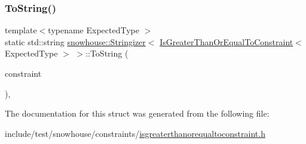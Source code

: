 \subsubsection{\texorpdfstring{ToString()}{ToString()}}
{\footnotesize\ttfamily template$<$typename Expected\+Type $>$ \\
static std\+::string \mbox{\hyperlink{structsnowhouse_1_1Stringizer}{snowhouse\+::\+Stringizer}}$<$ \mbox{\hyperlink{structsnowhouse_1_1IsGreaterThanOrEqualToConstraint}{Is\+Greater\+Than\+Or\+Equal\+To\+Constraint}}$<$ Expected\+Type $>$ $>$\+::To\+String (\begin{DoxyParamCaption}\item[{const \mbox{\hyperlink{structsnowhouse_1_1IsGreaterThanOrEqualToConstraint}{Is\+Greater\+Than\+Or\+Equal\+To\+Constraint}}$<$ Expected\+Type $>$ \&}]{constraint }\end{DoxyParamCaption})\hspace{0.3cm}{\ttfamily [inline]}, {\ttfamily [static]}}



The documentation for this struct was generated from the following file\+:\begin{DoxyCompactItemize}
\item 
include/test/snowhouse/constraints/\mbox{\hyperlink{isgreaterthanorequaltoconstraint_8h}{isgreaterthanorequaltoconstraint.\+h}}\end{DoxyCompactItemize}

